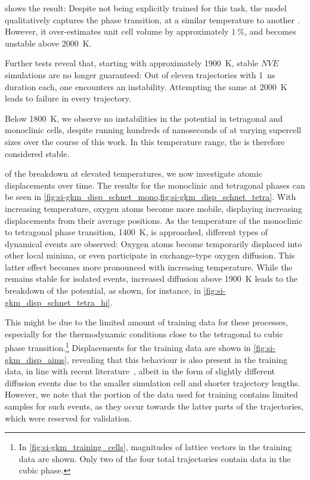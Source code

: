 shows the result: Despite not being explicitly trained for this task, the model qualitatively captures the phase transition, at a similar temperature to another \mlp{}. However, it over-estimates unit cell volume by approximately $\qty{1}{\percent}$, and becomes unstable above \qty{2000}{K}.

Further tests reveal that, starting with approximately \qty{1900}{K}, stable $NVE$ simulations are no longer guaranteed: Out of eleven trajectories with \qty{1}{ns} duration each, one encounters an instability. Attempting the same at \qty{2000}{K} leads to failure in every trajectory.

Below \qty{1800}{K}, we observe no instabilities in the potential in tetragonal and monoclinic cells, despite running hundreds of nanoseconds of \md{} at varying supercell sizes over the course of this work. In this temperature range, the \mlp is therefore considered stable.

 of the \mlp breakdown at elevated temperatures, we now investigate atomic displacements over time. The results for the monoclinic and tetragonal phases can be seen in \cref{fig:si-gkm_disp_schnet_mono,fig:si-gkm_disp_schnet_tetra}.
With increasing temperature, oxygen atoms become more mobile, displaying increasing displacements from their average positions.
As the temperature of the monoclinic to tetragonal phase transition, \qty{1400}{K}, is approached, different types of dynamical events are observed: Oxygen atoms become temporarily displaced into other local minima, or even participate in exchange-type oxygen diffusion.
This latter effect becomes more pronounced with increasing temperature.
While the \mlp remains stable for isolated events, increased diffusion above \qty{1900}{K} leads to the breakdown of the potential, as shown, for instance, in \cref{fig:si-gkm_disp_schnet_tetra_hi}.

This might be due to the limited amount of training data for these processes, especially for the thermodynamic conditions close to the tetragonal to cubic phase transition.\footnote{In \cref{fig:si-gkm_training_cells}, magnitudes of lattice vectors in the training data are shown. Only two of the four total trajectories contain data in the cubic phase.}
Displacements for the training data are shown in \cref{fig:si-gkm_disp_aims}, revealing that this behaviour is also present in the training data, in line with recent literature~\cite{tw2023t}, albeit in the form of slightly different diffusion events due to the smaller simulation cell and shorter trajectory lengths.
However, we note that the portion of the data used for training contains limited samples for such events, as they occur towards the latter parts of the trajectories, which were reserved for validation.

